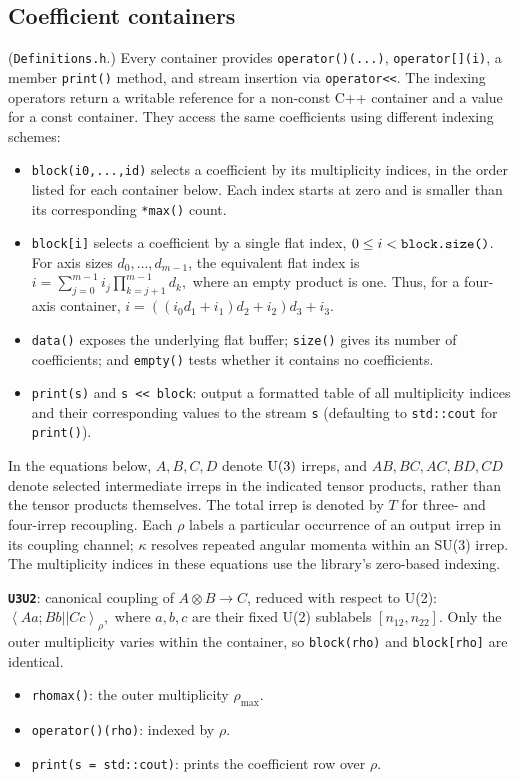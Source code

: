 \documentclass[aps,onecolumn,10pt,superscriptaddress,floatfix,nofootinbib]{revtex4}
\begin{document}
\subsection{Coefficient containers}
(\verb|Definitions.h|.) Every container provides
\verb|operator()(...)|, \verb|operator[](i)|, a member \verb|print()| method, and stream insertion via \verb|operator<<|. The indexing operators return a writable reference for a non-const C++
container and a value for a const container. They access the same
coefficients using different indexing schemes:
\begin{itemize}
    \item \verb|block(i0,...,id)| selects a coefficient by its multiplicity
    indices, in the order listed for each container below. Each index starts at
    zero and is smaller than its corresponding \verb|*max()| count.
    \item \verb|block[i]| selects a coefficient by a single flat index,
    $0\leq i<\verb|block.size()|$. For axis sizes $d_0,\ldots,d_{m-1}$,
    the equivalent flat index is
    $
      i=\sum_{j=0}^{m-1} i_j\prod_{k=j+1}^{m-1}d_k,
    $
    where an empty product is one. Thus, for a four-axis container,
    $i=((i_0d_1+i_1)d_2+i_2)d_3+i_3$.
    \item \verb|data()| exposes the underlying flat buffer;
    \verb|size()| gives its number of coefficients; and \verb|empty()|
    tests whether it contains no coefficients.
    \item \verb|print(s)| and \verb|s << block|: output a formatted table of all multiplicity indices and their corresponding values to the stream \verb|s| (defaulting to \verb|std::cout| for \verb|print()|).
\end{itemize}

In the equations below, $A,B,C,D$ denote $\rm U(3)$ irreps, and $AB,BC,AC,BD,CD$
denote selected intermediate irreps in the indicated tensor products, rather
than the tensor products themselves. The total irrep is denoted by $T$ for
three- and four-irrep recoupling. Each $\rho$
labels a particular occurrence of an output irrep in its coupling channel;
$\kappa$ resolves repeated angular momenta within an SU(3) irrep. The
multiplicity indices in these equations use the library's zero-based indexing.

\textbf{\texttt{U3U2}}: canonical coupling of $A\otimes B\to C$, reduced with
respect to U(2):
$
  \left\langle
  A a; B b || C c
  \right\rangle_{\rho},
$
where $a,b,c$ are their fixed U(2) sublabels
$[n_{12},n_{22}]$. Only the outer multiplicity varies within the container,
so \verb|block(rho)| and \verb|block[rho]| are identical.
\begin{itemize}
    \item \verb|rhomax()|: the outer multiplicity $\rho_{\max}$.
    \item \verb|operator()(rho)|: indexed by $\rho$.
    \item \verb|print(s = std::cout)|: prints the coefficient row over $\rho$.
\end{itemize}
\end{document}
